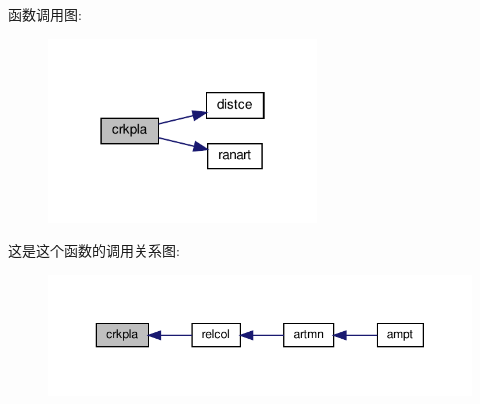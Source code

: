 函数调用图\+:
\nopagebreak
\begin{figure}[H]
\begin{center}
\leavevmode
\includegraphics[width=202pt]{crkpla_8f90_a4438f02b1f2301e7f052522e306cb453_cgraph}
\end{center}
\end{figure}
这是这个函数的调用关系图\+:
\nopagebreak
\begin{figure}[H]
\begin{center}
\leavevmode
\includegraphics[width=350pt]{crkpla_8f90_a4438f02b1f2301e7f052522e306cb453_icgraph}
\end{center}
\end{figure}
